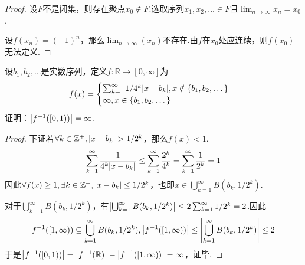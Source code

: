 \begin{proof}
    设\(F\)不是闭集，则存在聚点\(x_0 \notin F\).选取序列\(x_1, x_2, \dots \in F\)且\(\lim_{n \to \infty}x_n=x_0\).

    设\(f(x_n)=(-1)^n\)，那么\(\lim_{n \to \infty}(x_n)\)不存在.由\(f\)在\(x_0\)处应连续，则\(f(x_0)\)无法定义.
\end{proof}

\begin{problem}[14]\label{2.E.14}
    设\(b_1, b_2, \dots\)是实数序列，定义\(f: \mathbb{R} \to [0,\infty]\)为
    \begin{align*}
        f(x)=
        \begin{cases}
            \sum_{k=1}^\infty 1/4^k \abs*{x-b_k}, x \notin \{b_1, b_2, \dots\} \\
            \infty, x \in \{b_1, b_2, \dots\}
        \end{cases}
    \end{align*}
    证明：\(\abs*{f^{-1}([0,1))}=\infty\).
\end{problem}

\begin{proof}
    下证若\(\forall k \in \mathbb{Z}^+, \abs*{x-b_k}>1/2^k\)，那么\(f(x)<1\).
    \begin{align*}
        \sum_{k=1}^\infty \frac{1}{4^k \abs*{x-b_k}} \leq \sum_{k=1}^\infty \frac{2^k}{4^k}=\sum_{k=1}^\infty \frac{1}{2^k}=1
    \end{align*}
    因此\(\forall f(x) \geq 1, \exists k \in \mathbb{Z}^+, \abs*{x-b_k} \leq 1/2^k\)，也即\(x \in \bigcup_{k=1}^\infty B(b_k, 1/2^k)\).

    对于\(\bigcup_{k=1}^\infty B(b_k, 1/2^k)\)，有\(\abs*{\bigcup_{k=1}^\infty B(b_k, 1/2^k)} \leq 2\sum_{k=1}^\infty 1/2^k=2\).因此
    \begin{align*}
        f^{-1}([1,\infty)) \subseteq \bigcup_{k=1}^\infty B(b_k, 1/2^k),
        \abs*{f^{-1}([1,\infty))} \leq \abs*{\bigcup_{k=1}^\infty B(b_k, 1/2^k)} \leq 2
    \end{align*}
    于是\(\abs*{f^{-1}([0,1))}=\abs*{f^{-1}(\mathbb{R})}-\abs*{f^{-1}([1,\infty))}=\infty\)，证毕.
\end{proof}